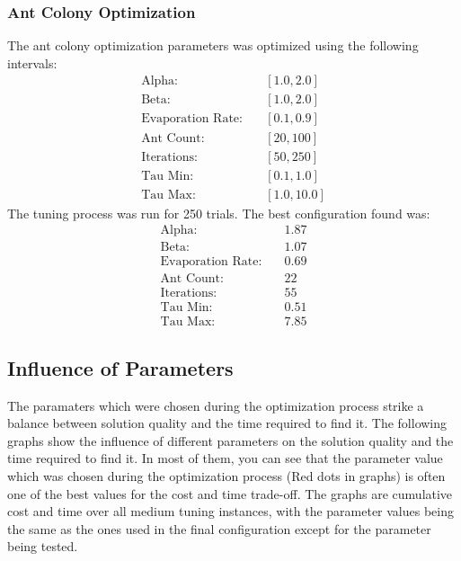 \documentclass{article}
\begin{document}
\subsubsection{Ant Colony Optimization}
The ant colony optimization parameters was optimized using the following intervals:
\begin{align*}
    \text{Alpha:} & \quad [1.0, 2.0] \\
    \text{Beta:} & \quad [1.0, 2.0] \\
    \text{Evaporation Rate:} & \quad [0.1, 0.9] \\
    \text{Ant Count:} & \quad [20, 100] \\
    \text{Iterations:} & \quad [50, 250] \\
    \text{Tau Min:} & \quad [0.1, 1.0] \\
    \text{Tau Max:} & \quad [1.0, 10.0]
\end{align*}
The tuning process was run for 250 trials. The best configuration found was:
\begin{align*}
    \text{Alpha:} & \quad 1.87 \\
    \text{Beta:} & \quad 1.07 \\
    \text{Evaporation Rate:} & \quad 0.69 \\
    \text{Ant Count:} & \quad 22 \\
    \text{Iterations:} & \quad 55 \\
    \text{Tau Min:} & \quad 0.51 \\
    \text{Tau Max:} & \quad 7.85
\end{align*}

\subsection{Influence of Parameters}
The paramaters which were chosen during the optimization process strike a balance between solution quality and the time required to find it.
The following graphs show the influence of different parameters on the solution quality and the time required to find it.
In most of them, you can see that the parameter value which was chosen during the optimization process (Red dots in graphs) is often one of the best values for the cost and time trade-off.
The graphs are cumulative cost and time over all medium tuning instances, with the parameter values being the same as the ones used in the final configuration except for the parameter being tested.
\end{document}
